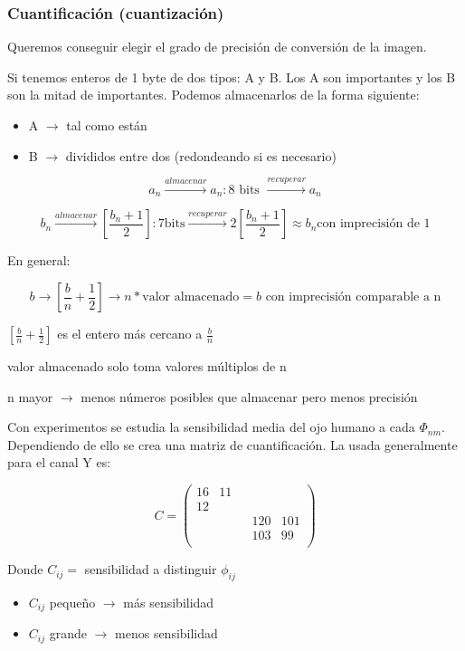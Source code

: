 		\subsubsection{Cuantificación (cuantización)}

			Queremos conseguir elegir el grado de precisión de conversión de la imagen.

			Si tenemos enteros de 1 byte de dos tipos: A y B. Los A son importantes y los B son la mitad de importantes. Podemos almacenarlos de la forma siguiente:
			\begin{itemize}
				\item A $\rightarrow$ tal como están
				\item B $\rightarrow$ divididos entre dos (redondeando si es necesario)
			\end{itemize}

			$$ a_{n} \xrightarrow{almacenar} a_n : 8 \text{ bits } \xrightarrow{recuperar} a_n $$

			$$ b_n \xrightarrow{almacenar} \left[ \frac{b_{n} + 1}{2} \right] : 7 \text{bits} \xrightarrow{recuperar} 2 \left[ \frac{b_n+1}{2} \right] \approx b_n \text{con imprecisión de 1} $$


			En general:

			$$ b \rightarrow \left[ \frac{b}{n} + \frac{1}{2} \right] \rightarrow n * \text{valor almacenado} = b \text{ con imprecisión comparable a n} $$

			$\left[ \frac{b}{n} + \frac{1}{2} \right]$ es el entero más cercano a $\frac{b}{n}$

			valor almacenado solo toma valores múltiplos de n

			n mayor $\rightarrow$ menos números posibles que almacenar pero menos precisión


			Con experimentos se estudia la sensibilidad media del ojo humano a cada $\Phi_{nm}$. Dependiendo de ello se crea una matriz de cuantificación. La usada generalmente para el canal Y es:


			$$ C = \left(\begin{matrix}
			16 & 11 & & & \\
			12 \\
			& & & 120 & 101 \\
			& & & 103 & 99 \\
			\end{matrix}\right)
			$$

			Donde $C_{ij} = $ sensibilidad a distinguir $\phi_{ij}$
			\begin{itemize}
				\item $C_{ij}$ pequeño $\rightarrow$ más sensibilidad
				\item $C_{ij}$ grande $\rightarrow$ menos sensibilidad
			\end{itemize}

